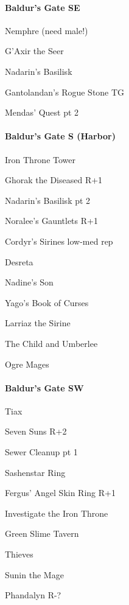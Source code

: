 \documentclass[10pt,a4,twoside]{book}
\begin{document}
\begin{multicols}{3}
\paragraph*{Baldur's Gate SE}
\begin{trivlist}
\item Nemphre (need male!)
\item G'Axir the Seer
\item Nadarin's Basilisk  \label{nadarin} %
\item Gantolandan's Rogue Stone TG

\item Mendas' Quest pt 2 %
\end{trivlist}

\paragraph*{Baldur's Gate S (Harbor)}
\begin{trivlist}
\item Iron Throne Tower
\item Ghorak the Diseased {\textcolor{OliveGreen}{R+1}}  \label{ghorak} %
\item Nadarin's Basilisk pt 2  \label{basilisk} %
\item Noralee's Gauntlets {\textcolor{OliveGreen}{R+1}}
\item Cordyr's Sirines low-med rep  \label{cordyr} %
\item Desreta
\item Nadine's Son  \label{nadine} %
\item Yago's Book of Curses  \label{yago} %
\item Larriaz the Sirine
\item The Child and Umberlee
\item Ogre Mages
\end{trivlist}

\paragraph*{Baldur's Gate SW}
\begin{trivlist}
\item Tiax
\item Seven Suns {\textcolor{OliveGreen}{R+2}}
\item Sewer Cleanup pt 1
\item Sashenstar Ring %
\item Fergus' Angel Skin Ring {\textcolor{OliveGreen}{R+1}}
\item Investigate the Iron Throne
\item Green Slime Tavern
\item Thieves
\item Sunin the Mage
\item Phandalyn \textcolor{Mahogany}{R-?}
\end{trivlist}


\end{multicols}
\end{document}
